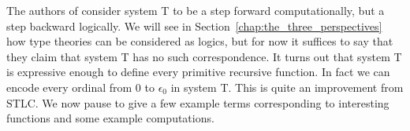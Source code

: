 The authors of \cite{Girard:1989} consider system T to be a step
forward computationally, but a step backward logically.  We will see
in Section~\ref{chap:the_three_perspectives} how type theories can be
considered as logics, but for now it suffices to say that they claim
that system T has no such correspondence.  It turns out that system T
is expressive enough to define every primitive recursive function.  In
fact we can encode every ordinal from 0 to $\epsilon_0$ in system T.
This is quite an improvement from STLC.  We now pause to give a few
example terms corresponding to interesting functions and some example
computations.


